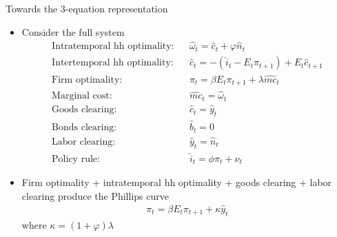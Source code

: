 \documentclass[9pt,xcolor={dvipsnames}]{beamer}
\newcommand{\bit}{\begin{itemize}}
\newcommand{\eit}{\end{itemize}}
\newcommand{\bc}{\color{blue}}
\begin{document}
\begin{frame}{Towards the 3-equation representation}

\bit
\setlength\itemsep{1.5em}
\item Consider the full system
\begin{eqnarray}
\text{Intratemporal hh optimality:} && \hat \omega_t = \hat c_t + \varphi \hat n_t  \nonumber \\
\text{Intertemporal hh optimality:} && \hat c_t =  - (\hat i_t - E_t \pi_{t+1}) + E_t \hat c_{t+1}  \nonumber \\
\text{Firm optimality:} && \pi_t = \beta E_t \pi_{t+1} + \lambda \widehat{mc}_t \nonumber \\
\text{Marginal cost:} && \widehat{mc}_t = \hat \omega_t \nonumber \\
\text{Goods clearing:} && \hat c_t = \hat y_t \nonumber \\
\text{Bonds clearing:} && \hat b_t = 0 \nonumber \\
\text{Labor clearing:} && \hat y_t = \hat n_t \nonumber \\
\text{Policy rule:} && \hat i_t = \phi \pi_t + \nu_t \nonumber 
\end{eqnarray}

\item Firm optimality + intratemporal hh optimality + goods clearing + labor clearing produce the {\bc Phillips curve}
\begin{eqnarray}
\pi_t = \beta E_t \pi_{t+1} + \kappa \hat y_t \nonumber
\end{eqnarray} 
where $\kappa = (1+\varphi)\lambda$

\eit

\end{frame}
\end{document}
